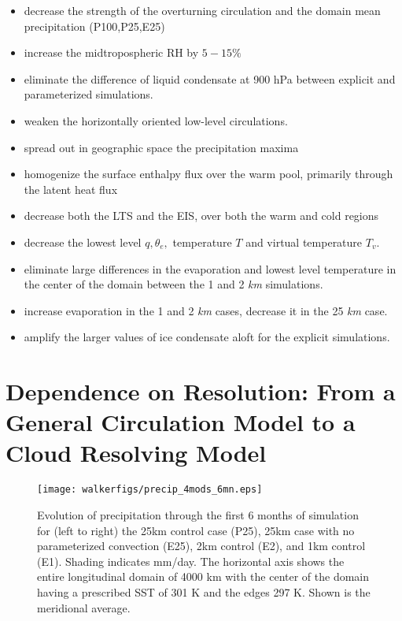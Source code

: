 \documentclass[11pt]{article}   	%
\begin{document}
\begin{itemize}
  \item decrease the strength of the overturning circulation and the domain mean precipitation (P100,P25,E25)
  \item increase the midtropospheric RH by $5-15 \% $
  \item eliminate the difference of liquid condensate at 900 hPa between explicit and parameterized simulations.
  \item weaken the horizontally oriented low-level circulations.   
  \item spread out in geographic space the precipitation maxima
  \item homogenize the surface enthalpy flux over the warm pool, primarily through the latent heat flux
  \item decrease both the LTS and the EIS, over both the warm and cold regions
  \item decrease the lowest level $q, \theta_e,$ temperature $T$ and virtual temperature $T_v$.  
  \item eliminate large differences in the evaporation and lowest level temperature in the center of the domain between 
           the 1 and 2 \textit{km} simulations. 
  \item increase evaporation in the 1 and 2 \textit{km} cases, decrease it in the 25 \textit{km} case.
  \item amplify the larger values of ice condensate aloft for the explicit simulations.  
\end{itemize}


\section{Dependence on Resolution: From a General Circulation Model to a Cloud Resolving Model}

\begin{figure}
  \texttt{[image: walkerfigs/precip\_4mods\_6mn.eps]}
  \caption{Evolution of precipitation through the first 6 months of simulation for (left to right) the 25km control case (P25), 
  25km case with no parameterized convection (E25), 2km control (E2), and 1km control (E1).  
  Shading indicates mm/day.  The horizontal axis shows the entire 
  longitudinal domain of 4000 km with the center of the domain having a prescribed SST of 301 K and the edges 297 K.  
  Shown is the meridional average. }
  \label{fig:hov_4mods_6mn}
\end{figure}
\end{document}
